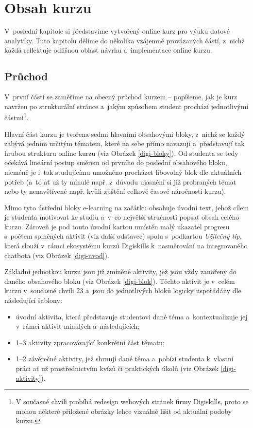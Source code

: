 \hypertarget{obsah-kurzu}{%
\chapter{Obsah kurzu}\label{obsah-kurzu}}

V~poslední kapitole si představíme vytvořený online kurz pro výuku datové analytiky. Tuto kapitolu dělíme do několika vzájemně provázaných částí, z~nichž každá reflektuje odlišnou oblast návrhu a~implementace online kurzu.

\hypertarget{prux16fchod}{%
\section{Průchod}\label{prux16fchod}}

V~první částí se zaměříme na obecný průchod kurzem -- popíšeme, jak je kurz navržen po strukturální stránce a~jakým způsobem student prochází jednotlivými částmi\footnote{V současné chvíli probíhá redesign webových stránek firmy Digiskills, proto se mohou některé přiložené obrázky lehce vizuálně lišit od aktuální podoby kurzu.}.

Hlavní část kurzu je tvořena sedmi hlavními obsahovými bloky, z~nichž se každý zabývá jedním určitým tématem, které na sebe přímo navazují a~představují tak hrubou strukturu online kurzu (viz Obrázek \ref{digi-bloky}). Od studenta se tedy očekává lineární postup směrem od prvního do poslední obsahového bloku, nicméně je i~tak studujícímu umožněno procházet libovolný blok dle aktuálních potřeb (a~to ať už ty minulé např. z~důvodu ujasnění si již probraných témat nebo ty nenavštívené např. kvůli zjištění celkové časové náročnosti kurzu).

Mimo tyto ústřední bloky e-learning na začátku obsahuje úvodní text, jehož cílem je studenta motivovat ke studiu a~v~co největší stručnosti popsat obsah celého kurzu. Zároveň je pod touto úvodní kartou umístěn malý ukazatel progresu s~počtem splněných aktivit (viz další odstavec) spolu s~podkartou \emph{Užitečný tip}, která slouží v~rámci ekosystému kurzů Digiskills k~nasměrování na integrovaného chatbota (viz Obrázek \ref{digi-uvod}).

Základní jednotkou kurzu jsou již zmíněné aktivity, jež jsou vždy zanořeny do daného obsahového bloku (viz Obrázek \ref{digi-blok}). Těchto aktivit je v~celém kurzu v~současné chvíli 23 a~jsou do jednotlivých bloků logicky uspořádány dle následující šablony:

\begin{itemize}
\tightlist
\item
  úvodní aktivita, která představuje studentovi dané téma a~kontextualizuje jej v~rámci aktivit minulých a~následujících;
\item
  1--3 aktivity zpracovávající konkrétní část tématu;
\item
  1--2 závěrečné aktivity, jež shrnují dané téma a~pobízí studenta k~vlastní práci ať už prostřednictvím kvízů či praktických úkolů (viz Obrázek \ref{digi-aktivity}).
\end{itemize}

